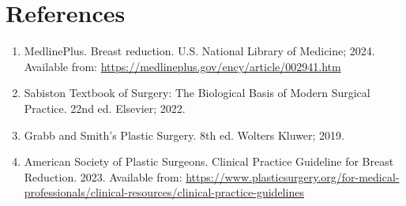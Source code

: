 \section*{References}
\begin{enumerate}
  \item MedlinePlus. Breast reduction. U.S. National Library of Medicine; 2024. Available from: \url{https://medlineplus.gov/ency/article/002941.htm}
  \item Sabiston Textbook of Surgery: The Biological Basis of Modern Surgical Practice. 22nd ed. Elsevier; 2022.
  \item Grabb and Smith's Plastic Surgery. 8th ed. Wolters Kluwer; 2019.
  \item American Society of Plastic Surgeons. Clinical Practice Guideline for Breast Reduction. 2023. Available from: \url{https://www.plasticsurgery.org/for-medical-professionals/clinical-resources/clinical-practice-guidelines}
\end{enumerate}

\clearpage
